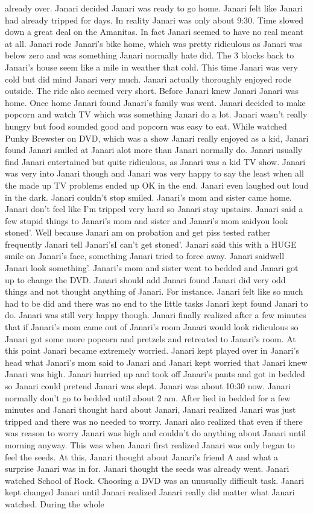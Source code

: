 \documentclass[12pt]{book}
\begin{document}
already over. Janari decided Janari was ready to go home. Janari felt like Janari had already tripped for days. In reality Janari was only about 9:30. Time slowed down a great deal on the Amanitas. In fact Janari seemed to have no real meant at all. Janari rode Janari's bike home, which was pretty ridiculous as Janari was below zero and was something Janari normally hate did. The 3 blocks back to Janari's house seem like a mile in weather that cold. This time Janari was very cold but did mind Janari very much. Janari actually thoroughly enjoyed rode outside. The ride also seemed very short. Before Janari knew Janari Janari was home. Once home Janari found Janari's family was went. Janari decided to make popcorn and watch TV which was something Janari do a lot. Janari wasn't really hungry but food sounded good and popcorn was easy to eat. While watched Punky Brewster on DVD, which was a show Janari really enjoyed as a kid, Janari found Janari smiled at Janari alot more than Janari normally do. Janari usually find Janari entertained but quite ridiculous, as Janari was a kid TV show. Janari was very into Janari though and Janari was very happy to say the least when all the made up TV problems ended up OK in the end. Janari even laughed out loud in the dark. Janari couldn't stop smiled. Janari's mom and sister came home. Janari don't feel like I'm tripped very hard so Janari stay upstairs. Janari said a few stupid things to Janari's mom and sister and Janari's mom saidyou look stoned'. Well because Janari am on probation and get piss tested rather frequently Janari tell Janari'sI can't get stoned'. Janari said this with a HUGE smile on Janari's face, something Janari tried to force away. Janari saidwell Janari look something'. Janari's mom and sister went to bedded and Janari got up to change the DVD. Janari should add Janari found Janari did very odd things and not thought anything of Janari. For instance. Janari felt like so much had to be did and there was no end to the little tasks Janari kept found Janari to do. Janari was still very happy though. Janari finally realized after a few minutes that if Janari's mom came out of Janari's room Janari would look ridiculous so Janari got some more popcorn and pretzels and retreated to Janari's room. At this point Janari became extremely worried. Janari kept played over in Janari's head what Janari's mom said to Janari and Janari kept worried that Janari knew Janari was high. Janari hurried up and took off Janari's pants and got in bedded so Janari could pretend Janari was slept. Janari was about 10:30 now. Janari normally don't go to bedded until about 2 am. After lied in bedded for a few minutes and Janari thought hard about Janari, Janari realized Janari was just tripped and there was no needed to worry. Janari also realized that even if there was reason to worry Janari was high and couldn't do anything about Janari until morning anyway. This was when Janari first realized Janari was only began to feel the seeds. At this, Janari thought about Janari's friend A and what a surprise Janari was in for. Janari thought the seeds was already went. Janari watched School of Rock. Choosing a DVD was an unusually difficult task. Janari kept changed Janari until Janari realized Janari really did matter what Janari watched. During the whole 
\end{document}

